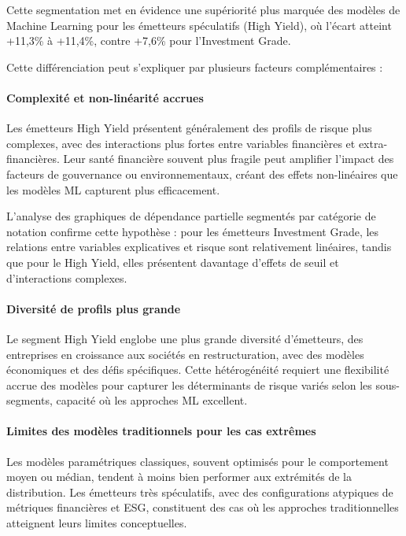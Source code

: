 Cette segmentation met en évidence une supériorité plus marquée des modèles de Machine Learning pour les émetteurs spéculatifs (High Yield), où l'écart atteint +11,3\% à +11,4\%, contre +7,6\% pour l'Investment Grade. 

Cette différenciation peut s'expliquer par plusieurs facteurs complémentaires :

\paragraph{Complexité et non-linéarité accrues} Les émetteurs High Yield présentent généralement des profils de risque plus complexes, avec des interactions plus fortes entre variables financières et extra-financières. Leur santé financière souvent plus fragile peut amplifier l'impact des facteurs de gouvernance ou environnementaux, créant des effets non-linéaires que les modèles ML capturent plus efficacement.

L'analyse des graphiques de dépendance partielle segmentés par catégorie de notation confirme cette hypothèse : pour les émetteurs Investment Grade, les relations entre variables explicatives et risque sont relativement linéaires, tandis que pour le High Yield, elles présentent davantage d'effets de seuil et d'interactions complexes.

\paragraph{Diversité de profils plus grande} Le segment High Yield englobe une plus grande diversité d'émetteurs, des entreprises en croissance aux sociétés en restructuration, avec des modèles économiques et des défis spécifiques. Cette hétérogénéité requiert une flexibilité accrue des modèles pour capturer les déterminants de risque variés selon les sous-segments, capacité où les approches ML excellent.

\paragraph{Limites des modèles traditionnels pour les cas extrêmes} Les modèles paramétriques classiques, souvent optimisés pour le comportement moyen ou médian, tendent à moins bien performer aux extrémités de la distribution. Les émetteurs très spéculatifs, avec des configurations atypiques de métriques financières et ESG, constituent des cas où les approches traditionnelles atteignent leurs limites conceptuelles.

